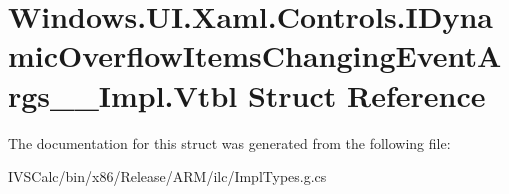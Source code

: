 \hypertarget{struct_windows_1_1_u_i_1_1_xaml_1_1_controls_1_1_i_dynamic_overflow_items_changing_event_args_____impl_1_1_vtbl}{}\section{Windows.\+U\+I.\+Xaml.\+Controls.\+I\+Dynamic\+Overflow\+Items\+Changing\+Event\+Args\+\_\+\+\_\+\+Impl.\+Vtbl Struct Reference}
\label{struct_windows_1_1_u_i_1_1_xaml_1_1_controls_1_1_i_dynamic_overflow_items_changing_event_args_____impl_1_1_vtbl}


The documentation for this struct was generated from the following file\+:\begin{DoxyCompactItemize}
\item 
I\+V\+S\+Calc/bin/x86/\+Release/\+A\+R\+M/ilc/Impl\+Types.\+g.\+cs\end{DoxyCompactItemize}
